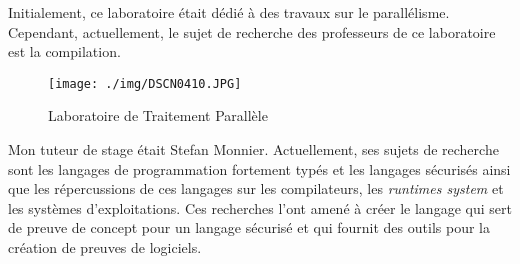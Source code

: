         Initialement, ce laboratoire était dédié à des travaux sur le parallélisme.
        Cependant, actuellement, le sujet de recherche des professeurs de ce laboratoire est la compilation.
        \begin{figure}[!h]
            \centering
            \texttt{[image: ./img/DSCN0410.JPG]}
            \caption{Laboratoire de Traitement Parallèle}
\label{fig:ltp}
        \end{figure}

        Mon tuteur de stage était Stefan Monnier. Actuellement, ses sujets de recherche sont les langages de programmation fortement typés et les
        langages sécurisés ainsi que les répercussions de ces langages sur les compilateurs, les \textit{runtimes system} et les systèmes d'exploitations.
        Ces recherches l'ont amené à créer le langage \typer{} qui sert de preuve de concept pour un langage sécurisé et qui fournit des outils
        pour la création de preuves de logiciels.

